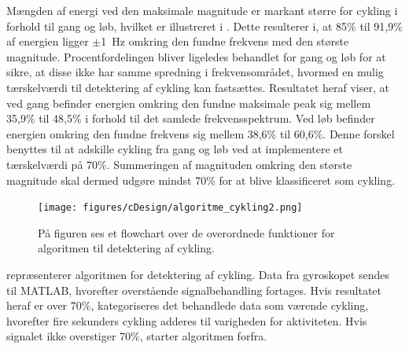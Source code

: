 Mængden af energi ved den maksimale magnitude er markant større for cykling i forhold til gang og løb, hvilket er illustreret i . Dette resulterer i, at 85\% til 91,9\% af energien ligger $\pm$1~Hz omkring den fundne frekvens med den største magnitude. Procentfordelingen bliver ligeledes behandlet for gang og løb for at sikre, at disse ikke har samme spredning i frekvensområdet, hvormed en mulig tærskelværdi til detektering af cykling kan fastsættes. Resultatet heraf viser, at ved gang befinder energien omkring den fundne maksimale peak sig mellem 35,9\% til 48,5\% i forhold til det samlede frekvensspektrum. Ved løb befinder energien omkring den fundne frekvens sig mellem 38,6\% til 60,6\%. Denne forskel benyttes til at adskille cykling fra gang og løb ved at implementere et tærskelværdi på 70\%. Summeringen af magnituden omkring den største magnitude skal dermed udgøre mindst 70\% for at blive klassificeret som cykling. 
\begin{figure}[H]
	\centering
	\texttt{[image: figures/cDesign/algoritme\_cykling2.png]}
	\caption{På figuren ses et flowchart over de overordnede funktioner for algoritmen til detektering af cykling.}
	\label{fig:algoritme_cykling}
\end{figure}\vspace{-0.25cm}
 repræsenterer algoritmen for detektering af cykling. Data fra gyroskopet sendes til MATLAB, hvorefter overstående signalbehandling fortages. Hvis resultatet heraf er over 70\%, kategoriseres det behandlede data som værende cykling, hvorefter fire sekunders cykling adderes til varigheden for aktiviteten. Hvis signalet ikke overstiger 70\%, starter algoritmen forfra.

